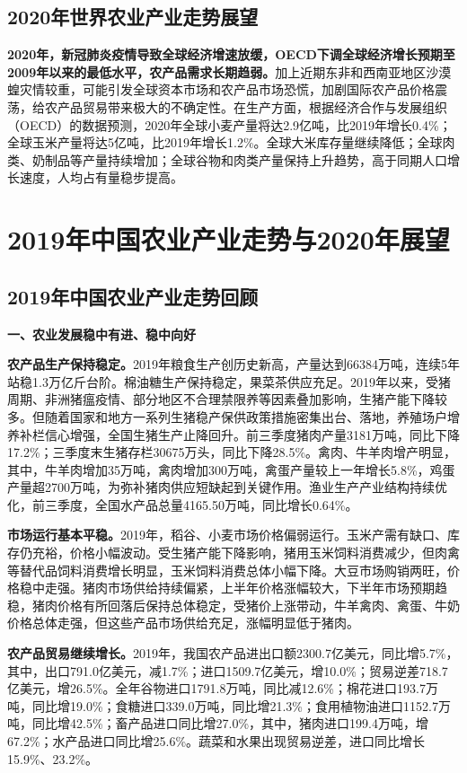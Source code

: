 \documentclass{progbookcn}
\begin{document}
\subsection{2020年世界农业产业走势展望}
\textbf{2020年，新冠肺炎疫情导致全球经济增速放缓，OECD下调全球经济增长预期至2009年以来的最低水平，农产品需求长期趋弱。}加上近期东非和西南亚地区沙漠蝗灾情较重，可能引发全球资本市场和农产品市场恐慌，加剧国际农产品价格震荡，给农产品贸易带来极大的不确定性。在生产方面，根据经济合作与发展组织（OECD）的数据预测，2020年全球小麦产量将达2.9亿吨，比2019年增长0.4\%；全球玉米产量将达5亿吨，比2019年增长1.2\%。全球大米库存量继续降低；全球肉类、奶制品等产量持续增加；全球谷物和肉类产量保持上升趋势，高于同期人口增长速度，人均占有量稳步提高。

\section{2019年中国农业产业走势与2020年展望}
\subsection{2019年中国农业产业走势回顾}
\textbf{一、农业发展稳中有进、稳中向好}

\textbf{农产品生产保持稳定。}2019年粮食生产创历史新高，产量达到66384万吨，连续5年站稳1.3万亿斤台阶。棉油糖生产保持稳定，果菜茶供应充足。2019年以来，受猪周期、非洲猪瘟疫情、部分地区不合理禁限养等因素叠加影响，生猪产能下降较多。但随着国家和地方一系列生猪稳产保供政策措施密集出台、落地，养殖场户增养补栏信心增强，全国生猪生产止降回升。前三季度猪肉产量3181万吨，同比下降17.2\%；三季度末生猪存栏30675万头，同比下降28.5\%。禽肉、牛羊肉增产明显，其中，牛羊肉增加35万吨，禽肉增加300万吨，禽蛋产量较上一年增长5.8\%，鸡蛋产量超2700万吨，为弥补猪肉供应短缺起到关键作用。渔业生产产业结构持续优化，前三季度，全国水产品总量4165.50万吨，同比增长0.64\%。

\textbf{市场运行基本平稳。}2019年，稻谷、小麦市场价格偏弱运行。玉米产需有缺口、库存仍充裕，价格小幅波动。受生猪产能下降影响，猪用玉米饲料消费减少，但肉禽等替代品饲料消费增长明显，玉米饲料消费总体小幅下降。大豆市场购销两旺，价格稳中走强。猪肉市场供给持续偏紧，上半年价格涨幅较大，下半年市场预期趋稳，猪肉价格有所回落后保持总体稳定，受猪价上涨带动，牛羊禽肉、禽蛋、牛奶价格总体走强，但这些产品市场供给充足，涨幅明显低于猪肉。

\textbf{农产品贸易继续增长。}2019年，我国农产品进出口额2300.7亿美元，同比增5.7\%，其中，出口791.0亿美元，减1.7\%；进口1509.7亿美元，增10.0\%；贸易逆差718.7亿美元，增26.5\%。全年谷物进口1791.8万吨，同比减12.6\%；棉花进口193.7万吨，同比增19.0\%；食糖进口339.0万吨，同比增21.3\%；食用植物油进口1152.7万吨，同比增42.5\%；畜产品进口同比增27.0\%，其中，猪肉进口199.4万吨，增67.2\%；水产品进口同比增25.6\%。蔬菜和水果出现贸易逆差，进口同比增长15.9\%、23.2\%。
\end{document}
